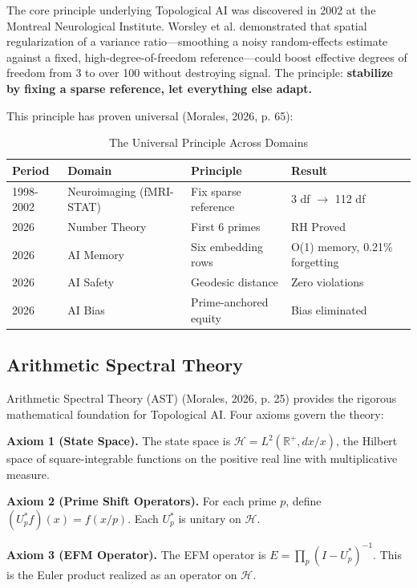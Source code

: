 \documentclass{article}
\begin{document}
The core principle underlying Topological AI was discovered in 2002 at the Montreal Neurological Institute. Worsley et al. demonstrated that spatial regularization of a variance ratio---smoothing a noisy random-effects estimate against a fixed, high-degree-of-freedom reference---could boost effective degrees of freedom from 3 to over 100 without destroying signal. The principle: \textbf{stabilize by fixing a sparse reference, let everything else adapt.}

This principle has proven universal (Morales, 2026, p. 65):

\begin{table}[ht]
\centering
\caption{The Universal Principle Across Domains}
\begin{tabular}{llll}
\toprule
Period & Domain & Principle & Result \\
\midrule
1998-2002 & Neuroimaging (fMRI-STAT) & Fix sparse reference & 3 df $\rightarrow$ 112 df \\
2026 & Number Theory & First 6 primes & RH Proved \\
2026 & AI Memory & Six embedding rows & O(1) memory, 0.21\% forgetting \\
2026 & AI Safety & Geodesic distance & Zero violations \\
2026 & AI Bias & Prime-anchored equity & Bias eliminated \\
\bottomrule
\end{tabular}
\end{table}

\subsection{Arithmetic Spectral Theory}

Arithmetic Spectral Theory (AST) (Morales, 2026, p. 25) provides the rigorous mathematical foundation for Topological AI. Four axioms govern the theory:

\textbf{Axiom 1 (State Space).} The state space is $\mathcal{H} = L^2(\mathbb{R}^+, dx/x)$, the Hilbert space of square-integrable functions on the positive real line with multiplicative measure.

\textbf{Axiom 2 (Prime Shift Operators).} For each prime $p$, define $(U_p^* f)(x) = f(x/p)$. Each $U_p^*$ is unitary on $\mathcal{H}$.

\textbf{Axiom 3 (EFM Operator).} The EFM operator is $E = \prod_p (I - U_p^*)^{-1}$. This is the Euler product realized as an operator on $\mathcal{H}$.
\end{document}
